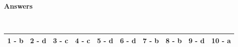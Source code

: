 \documentclass{article}
\begin{document}
\noindent  \\   \\  

\noindent \textbf{Answers}

\noindent 

\noindent  \\  

\begin{tabular}{|p{0.7in}|p{0.5in}|p{0.5in}|p{0.5in}|p{0.5in}|p{0.5in}|p{0.5in}|p{0.5in}|p{0.5in}|p{0.5in}|} \hline 
	1 - b & 2 - d & 3 - c & 4 - c & 5 - d & 6 - d & 7 - b & 8 - b & 9 - d & 10 - a \\ \hline 
\end{tabular}

 
\end{document}

